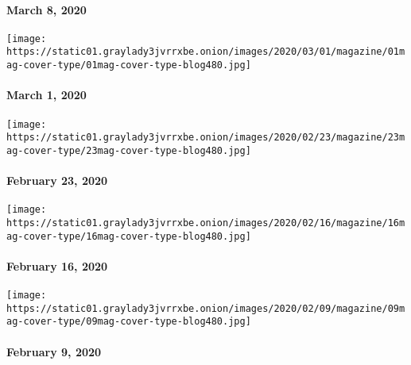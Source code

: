 \hypertarget{march-8-2020}{%
\paragraph{March 8, 2020}\label{march-8-2020}}

\href{https://www.nytimes3xbfgragh.onion/issue/magazine/2020/02/27/the-3120-issue}{}

\texttt{[image: https://static01.graylady3jvrrxbe.onion/images/2020/03/01/magazine/01mag-cover-type/01mag-cover-type-blog480.jpg]}

\hypertarget{march-1-2020}{%
\paragraph{March 1, 2020}\label{march-1-2020}}

\href{https://www.nytimes3xbfgragh.onion/issue/magazine/2020/02/20/the-22320-issue}{}

\texttt{[image: https://static01.graylady3jvrrxbe.onion/images/2020/02/23/magazine/23mag-cover-type/23mag-cover-type-blog480.jpg]}

\hypertarget{february-23-2020}{%
\paragraph{February 23, 2020}\label{february-23-2020}}

\href{https://www.nytimes3xbfgragh.onion/issue/magazine/2020/02/13/the-21620-issue}{}

\texttt{[image: https://static01.graylady3jvrrxbe.onion/images/2020/02/16/magazine/16mag-cover-type/16mag-cover-type-blog480.jpg]}

\hypertarget{february-16-2020}{%
\paragraph{February 16, 2020}\label{february-16-2020}}

\href{https://www.nytimes3xbfgragh.onion/issue/magazine/2020/02/06/the-2920-issue}{}

\texttt{[image: https://static01.graylady3jvrrxbe.onion/images/2020/02/09/magazine/09mag-cover-type/09mag-cover-type-blog480.jpg]}

\hypertarget{february-9-2020}{%
\paragraph{February 9, 2020}\label{february-9-2020}}

